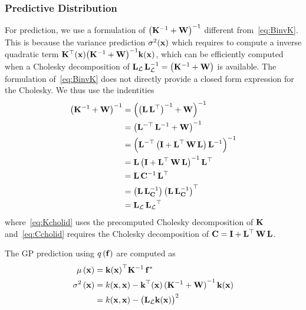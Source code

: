 \subsubsection{Predictive Distribution}
For prediction, we use a formulation of \({\big(\mathbf{K}^{-1} + \mathbf{W}\big)}^{-1}\) different from~\cref{eq:BinvK}.
This is because the variance prediction \(\sigma^2(\mathbf{x})\) which requires to compute a inverse quadratic term \(\mathbf{K}^{\top}(\mathbf{x}) {\big(\mathbf{K}^{-1} + \mathbf{W}\big)}^{-1} \mathbf{k}(\mathbf{x})\), which can be efficiently computed when a Cholesky decomposition of \(\mathbf{L}_{\mathcal{L}} \, \mathbf{L}^{-1}_{\mathcal{L}}  = {\big(\mathbf{K}^{-1} + \mathbf{W}\big)}\) is available.
The formulation of~\cref{eq:BinvK} does not directly provide a closed form expression for the Cholesky.
We thus use the indentities
\begin{align}
  {\big(\mathbf{K}^{-1} + \mathbf{W}\big)}^{-1}
  &= { \Big({\big(\mathbf{L}\,\mathbf{L}^{\top}\big)}^{-1} + \mathbf{W} \Big) }^{-1} \label{eq:Kcholid}  \\
  &= { \big(\mathbf{L}^{-\top}\,\mathbf{L}^{-1} + \mathbf{W} \big) }^{-1}  \\
  &= { \Big( \mathbf{L}^{-\top}\,\big(\mathbf{I} + \mathbf{L}^{\top}\,\mathbf{W}\,\mathbf{L} \big)\,\mathbf{L}^{-1} \Big) }^{-1}  \\
  &= \mathbf{L}\,{\big(\mathbf{I} + \mathbf{L}^{\top}\,\mathbf{W}\,\mathbf{L} \big)}^{-1}\,\mathbf{L}^{\top}  \\
  &= \mathbf{L}\, \mathbf{C}^{-1} \,\mathbf{L}^{\top}  \\
  &= \big( \mathbf{L}\, \mathbf{L}_{\mathbf{C}}^{-1} \big)\, {\big( \mathbf{L}\, \mathbf{L}_{\mathbf{C}}^{-1} \big)}^{\top} \label{eq:Ccholid} \\
  &= \mathbf{L}_{\mathcal{L}} \, { \mathbf{L}_{\mathcal{L}} }^{\top}
\end{align}
where~\cref{eq:Kcholid} uses the precomputed Cholesky decomposition of \(\mathbf{K}\) and~\cref{eq:Ccholid} requires the Cholesky decomposition of \(\mathbf{C} = \mathbf{I} + \mathbf{L}^{\top}\,\mathbf{W}\,\mathbf{L}\).

The GP prediction using \(q\,(\mathbf{f})\) are computed as
\begin{align}
  \mu\,(\mathbf{x})
  &= {\mathbf{k}(\mathbf{x})}^{\top} \mathbf{K}^{-1} \, \mathbf{f}^*  \\
  \sigma^2\,(\mathbf{x})
  &= k(\mathbf{x}, \mathbf{x}) - \mathbf{k}^{\top}(\mathbf{x}) \, {(\mathbf{K}^{-1} + \mathbf{W})}^{-1} \, \mathbf{k}(\mathbf{x}) \\
  &= k(\mathbf{x}, \mathbf{x}) - {\big( \mathbf{L}_{\mathcal{L}} \mathbf{k}(\mathbf{x}) \big)}^2
\end{align}

